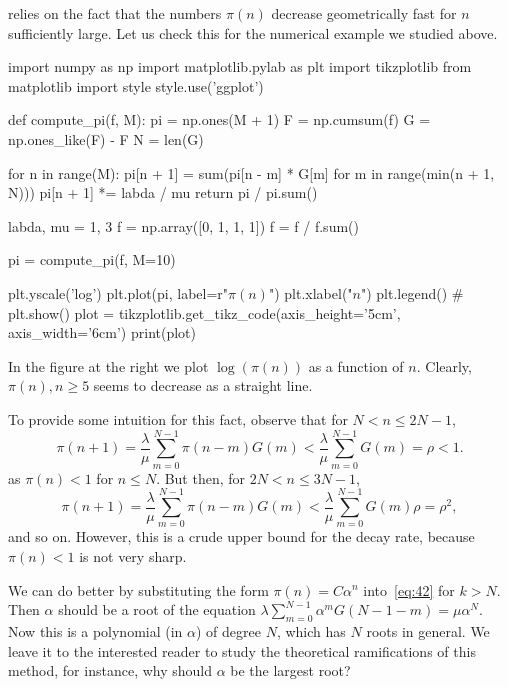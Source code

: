  relies on the fact that the numbers $\pi(n)$ decrease geometrically fast for $n$ sufficiently large.
Let us check this for the numerical example we studied above.
\begin{marginfigure}
\begin{pycode}[ignore]
import numpy as np
import matplotlib.pylab as plt
import tikzplotlib
from matplotlib import style
style.use('ggplot')

def compute_pi(f, M):
    pi = np.ones(M + 1)
    F = np.cumsum(f)
    G = np.ones_like(F) - F
    N = len(G)

    for n in range(M):
        pi[n + 1] = sum(pi[n - m] * G[m] for m in range(min(n + 1, N)))
        pi[n + 1] *= labda / mu
    return pi / pi.sum()

labda, mu = 1, 3
f = np.array([0, 1, 1, 1])
f = f / f.sum()

pi = compute_pi(f, M=10)


plt.yscale('log')
plt.plot(pi, label=r"$\pi(n)$")
plt.xlabel("$n$")
plt.legend()
# plt.show()
plot = tikzplotlib.get_tikz_code(axis_height='5cm', axis_width='6cm')
print(plot)
\end{pycode}
\end{marginfigure}
In the figure at the right we plot $\log (\pi(n))$  as a function of $n$. Clearly, $\pi(n), n\geq 5$ seems to decrease as a straight line.


To provide some intuition for this fact, observe that  for $N<n\leq 2N-1$,
\begin{equation*}
  \pi(n+1) = \frac{\lambda}{\mu} \sum_{m=0}^{N-1}\pi(n-m)G(m) < \frac{\lambda}{\mu} \sum_{m=0}^{N-1} G(m)  = \rho < 1.
\end{equation*}
as $\pi(n) < 1$ for $n\leq N$. But then, for $2N< n \leq 3N-1$,
\begin{equation*}
  \pi(n+1) = \frac{\lambda}{\mu} \sum_{m=0}^{N-1}\pi(n-m)G(m) < \frac{\lambda}{\mu} \sum_{m=0}^{N-1} G(m)\rho  = \rho^2,
\end{equation*}
and so on. However, this is a crude upper bound for the decay rate, because $\pi(n)<1$ is not very sharp.

We can do better by substituting the form $\pi(n)= C \alpha^n$ into~\cref{eq:42} for $k>N$.
Then $\alpha$ should be a root of the equation $\lambda \sum_{m=0}^{N-1} \alpha^m G(N-1-m) = \mu \alpha^{N}$.
Now this is a polynomial (in $\alpha$) of degree $N$, which has $N$ roots in general.
We leave it to the interested reader to study the theoretical ramifications of this method, for instance, why should $\alpha$ be the largest root?


